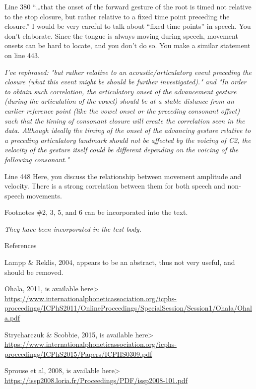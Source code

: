 \documentclass[]{article}
\begin{document}
Line 380 ``\ldots{}that the onset of the forward gesture of the root is
timed not relative to the stop closure, but rather relative to a fixed
time point preceding the closure.'' I would be very careful to talk
about ``fixed time points'' in speech. You don't elaborate. Since the
tongue is always moving during speech, movement onsets can be hard to
locate, and you don't do so. You make a similar statement on line 443.

\begin{adjustwidth}{1cm}{} \textit{
I've rephrased: "but rather relative to an acoustic/articulatory event preceding the closure (what this event might be should be further investigated)." and "In order to obtain such correlation, the articulatory onset of the advancement gesture (during the articulation of the vowel) should be at a stable distance from an earlier reference point (like the vowel onset or the preceding consonant offset) such that the timing of consonant closure will create the correlation seen in the data.
Although ideally the timing of the onset of the advancing gesture relative to a preceding articulatory landmark should not be affected by the voicing of C2, the velocity of the gesture itself could be different depending on the voicing of the following consonant."
} \end{adjustwidth}

Line 448 Here, you discuss the relationship between movement amplitude
and velocity. There is a strong correlation between them for both speech
and non-speech movements.

Footnotes \#2, 3, 5, and 6 can be incorporated into the text.

\begin{adjustwidth}{1cm}{} \textit{
They have been incorporated in the text body.
} \end{adjustwidth}

References

Lampp \& Reklis, 2004, appears to be an abstract, thus not very useful,
and should be removed.

Ohala, 2011, is available here\textgreater{}
\url{https://www.internationalphoneticassociation.org/icphs-proceedings/ICPhS2011/OnlineProceedings/SpecialSession/Session1/Ohala/Ohala.pdf}

Strycharczuk \& Scobbie, 2015, is available here\textgreater{}
\url{https://www.internationalphoneticassociation.org/icphs-proceedings/ICPhS2015/Papers/ICPHS0309.pdf}

Sprouse et al, 2008, is available here\textgreater{}
\url{https://issp2008.loria.fr/Proceedings/PDF/issp2008-101.pdf}
\end{document}
